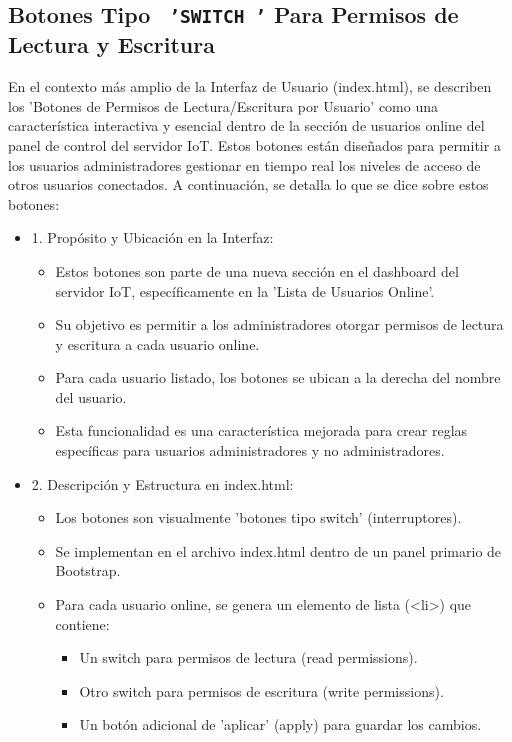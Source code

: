 \documentclass{report}
\begin{document}
\subsection{Botones Tipo \texttt{ 'SWITCH '} Para Permisos de Lectura y Escritura}
En el contexto más amplio de la Interfaz de Usuario (index.html), se  describen los 'Botones de Permisos de Lectura/Escritura 
por Usuario' como una característica interactiva y esencial dentro de la sección de usuarios online del panel de control del servidor IoT. 
Estos botones están diseñados para permitir a los usuarios administradores gestionar en tiempo real los niveles de acceso de otros 
usuarios conectados.
A continuación, se detalla lo que se  dice sobre estos botones:
\begin{itemize}
    \item 1. Propósito y Ubicación en la Interfaz:
    \begin{itemize}
        \item Estos botones son parte de una nueva sección en el dashboard del servidor IoT, específicamente en la 'Lista de Usuarios Online'.
        \item Su objetivo es permitir a los administradores otorgar permisos de lectura y escritura a cada usuario online.
        \item Para cada usuario listado, los botones se ubican a la derecha del nombre del usuario.
        \item Esta funcionalidad es una característica mejorada para crear reglas específicas para usuarios administradores y no administradores.
    \end{itemize}
    \item 2. Descripción y Estructura en index.html:
    \begin{itemize}
        \item Los botones son visualmente 'botones tipo switch' (interruptores).
        \item Se implementan en el archivo index.html dentro de un panel primario de Bootstrap.
        \item Para cada usuario online, se genera un elemento de lista (<li>) que contiene:
        \begin{itemize}
            \item Un switch para permisos de lectura (read permissions).
            \item Otro switch para permisos de escritura (write permissions).
            \item Un botón adicional de 'aplicar' (apply) para guardar los cambios.

\end{itemize}
\end{itemize}
\end{itemize}
\end{document}

